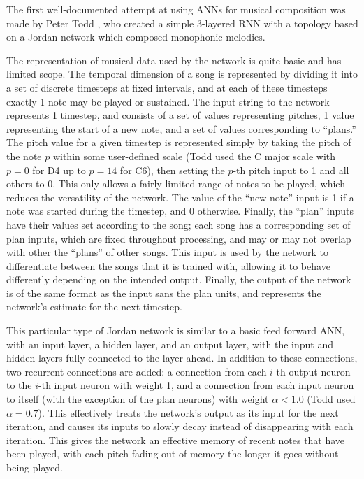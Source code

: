\documentclass[ author={Stephen Livermore-Tozer},
				supervisor={Dr. Peter Flach},
				degree={MEng},
				title={Algorithmic Co-composition Using Machine Learning},
				subtitle={},
				type={research},
				year={2016} ]{dissertation}
\begin{document}
	The first well-documented attempt at using ANNs for musical composition was made by Peter Todd \cite{todd1989connectionist}, who created a simple 3-layered RNN with a topology based on a Jordan network \cite{jordan1997serial} which composed monophonic melodies.
	
	The representation of musical data used by the network is quite basic and has limited scope. The temporal dimension of a song is represented by dividing it into a set of discrete timesteps at fixed intervals, and at each of these timesteps exactly 1 note may be played or sustained. The input string to the network represents 1 timestep, and consists of a set of values representing pitches, 1 value representing the start of a new note, and a set of values corresponding to ``plans.'' The pitch value for a given timestep is represented simply by taking the pitch of the note $p$ within some user-defined scale (Todd used the C major scale with $p = 0$ for D4 up to $p = 14$ for C6), then setting the $p$-th pitch input to 1 and all others to 0. This only allows a fairly limited range of notes to be played, which reduces the versatility of the network. The value of the ``new note'' input is 1 if a note was started during the timestep, and 0 otherwise. Finally, the ``plan'' inputs have their values set according to the song; each song has a corresponding set of plan inputs, which are fixed throughout processing, and may or may not overlap with other the ``plans'' of other songs. This input is used by the network to differentiate between the songs that it is trained with, allowing it to behave differently depending on the intended output. Finally, the output of the network is of the same format as the input sans the plan units, and represents the network's estimate for the next timestep.
	
	This particular type of Jordan network is similar to a basic feed forward ANN, with an input layer, a hidden layer, and an output layer, with the input and hidden layers fully connected to the layer ahead. In addition to these connections, two recurrent connections are added: a connection from each $i$-th output neuron to the $i$-th input neuron with weight 1, and a connection from each input neuron to itself (with the exception of the plan neurons) with weight $\alpha < 1.0$ (Todd used $\alpha = 0.7$). This effectively treats the network's output as its input for the next iteration, and causes its inputs to slowly decay instead of disappearing with each iteration. This gives the network an effective memory of recent notes that have been played, with each pitch fading out of memory the longer it goes without being played.
	
\end{document}
